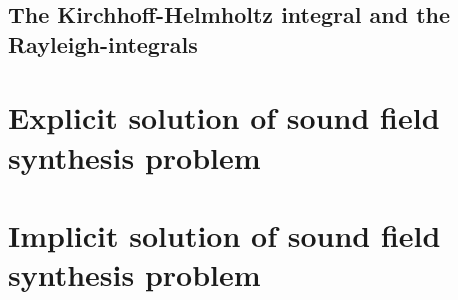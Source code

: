 \newpage
\subsection{The Kirchhoff-Helmholtz integral and the Rayleigh-integrals}



\newpage
\section{Explicit solution of sound field synthesis problem}

\section{Implicit solution of sound field synthesis problem}